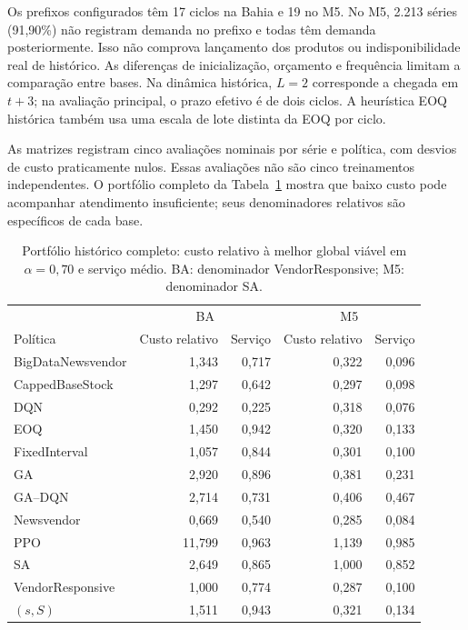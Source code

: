 Os prefixos configurados têm 17 ciclos na Bahia e 19 no M5. No M5, 2.213 séries (91,90\%) não registram demanda no prefixo e todas têm demanda posteriormente. Isso não comprova lançamento dos produtos ou indisponibilidade real de histórico. As diferenças de inicialização, orçamento e frequência limitam a comparação entre bases. Na dinâmica histórica, $L=2$ corresponde a chegada em $t+3$; na avaliação principal, o prazo efetivo é de dois ciclos. A heurística EOQ histórica também usa uma escala de lote distinta da EOQ por ciclo.

As matrizes registram cinco avaliações nominais por série e política, com desvios de custo praticamente nulos. Essas avaliações não são cinco treinamentos independentes. O portfólio completo da Tabela~\ref{tab:portfolio_dual} mostra que baixo custo pode acompanhar atendimento insuficiente; seus denominadores relativos são específicos de cada base.

\begin{table}[htbp]\centering\small
\caption{Portfólio histórico completo: custo relativo à melhor global viável em $\alpha=0{,}70$ e serviço médio. BA: denominador VendorResponsive; M5: denominador SA.}\label{tab:portfolio_dual}
\begin{tabular}{@{}lrrrr@{}}\toprule
 & \multicolumn{2}{c}{BA} & \multicolumn{2}{c}{M5}\\
Política & Custo relativo & Serviço & Custo relativo & Serviço\\\midrule
BigDataNewsvendor & 1,343 & 0,717 & 0,322 & 0,096\\
CappedBaseStock & 1,297 & 0,642 & 0,297 & 0,098\\
DQN & 0,292 & 0,225 & 0,318 & 0,076\\
EOQ & 1,450 & 0,942 & 0,320 & 0,133\\
FixedInterval & 1,057 & 0,844 & 0,301 & 0,100\\
GA & 2,920 & 0,896 & 0,381 & 0,231\\
GA--DQN & 2,714 & 0,731 & 0,406 & 0,467\\
Newsvendor & 0,669 & 0,540 & 0,285 & 0,084\\
PPO & 11,799 & 0,963 & 1,139 & 0,985\\
SA & 2,649 & 0,865 & 1,000 & 0,852\\
VendorResponsive & 1,000 & 0,774 & 0,287 & 0,100\\
$(s,S)$ & 1,511 & 0,943 & 0,321 & 0,134\\
\bottomrule\end{tabular}\end{table}

